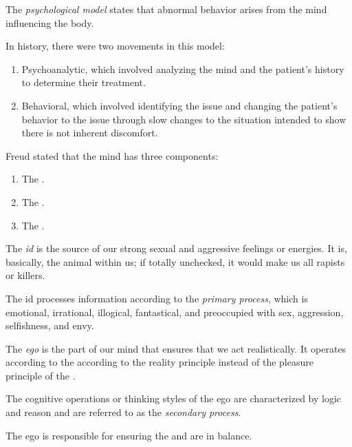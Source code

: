 \begin{definition}\label{def:Psychological_Model}
  The \emph{psychological model} states that abnormal behavior arises from the mind influencing the body.

  In history, there were two movements in this model:
  \begin{enumerate}[noitemsep]
  \item Psychoanalytic, which involved analyzing the mind and the patient's history to determine their treatment.
  \item Behavioral, which involved identifying the issue and changing the patient's behavior to the issue through slow changes to the situation intended to show there is not inherent discomfort.
  \end{enumerate}
\end{definition}

Freud stated that the mind has three components:
\begin{enumerate}[noitemsep]
\item The .
\item The .
\item The .
\end{enumerate}

\begin{definition}[Id]\label{def:Id}
  The \emph{id} is the source of our strong sexual and aggressive feelings or energies.
  It is, basically, the animal within us; if totally unchecked, it would make us all rapists or killers.

  The id processes information according to the \emph{primary process}, which is emotional, irrational, illogical, fantastical, and preoccupied with sex, aggression, selfishness, and envy.
\end{definition}

\begin{definition}[Ego]\label{def:Ego}
  The \emph{ego} is the part of our mind that ensures that we act realistically.
  It  operates according to the according to the reality principle instead of the pleasure principle of the .

  The cognitive operations or thinking styles of the ego are characterized by logic and reason and are referred to as the \emph{secondary process}.

  The ego is responsible for ensuring the  and  are in balance.
\end{definition}


